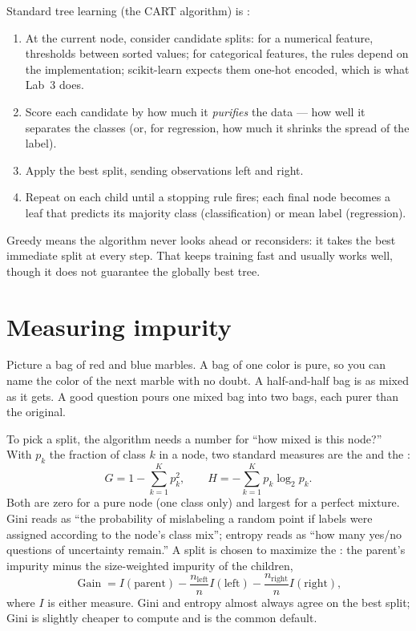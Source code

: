 Standard tree learning (the CART algorithm) is :

\begin{enumerate}
  \item At the current node, consider candidate splits: for a numerical feature, thresholds between sorted values; for categorical features, the rules depend on the implementation; scikit-learn expects them one-hot encoded, which is what Lab~3 does.
  \item Score each candidate by how much it \emph{purifies} the data --- how well it separates the classes (or, for regression, how much it shrinks the spread of the label).
  \item Apply the best split, sending observations left and right.
  \item Repeat on each child until a stopping rule fires; each final node becomes a leaf that predicts its majority class (classification) or mean label (regression).
\end{enumerate}

Greedy means the algorithm never looks ahead or reconsiders: it takes the best immediate split at every step. That keeps training fast and usually works well, though it does not guarantee the globally best tree.

\section{Measuring impurity}

\begin{analogy}
Picture a bag of red and blue marbles. A bag of one color is pure, so you can name the color of the next marble with no doubt. A half-and-half bag is as mixed as it gets. A good question pours one mixed bag into two bags, each purer than the original.
\end{analogy}

To pick a split, the algorithm needs a number for ``how mixed is this node?'' With $p_k$ the fraction of class $k$ in a node, two standard measures are the  and the :
\[
  G=1-\sum_{k=1}^{K}p_k^2,
  \qquad
  H=-\sum_{k=1}^{K}p_k\log_2 p_k.
\]
Both are zero for a pure node (one class only) and largest for a perfect mixture. Gini reads as ``the probability of mislabeling a random point if labels were assigned according to the node's class mix''; entropy reads as ``how many yes/no questions of uncertainty remain.'' A split is chosen to maximize the : the parent's impurity minus the size-weighted impurity of the children,
\[
  \operatorname{Gain}
  =I(\text{parent})
  -\frac{n_{\mathrm{left}}}{n}I(\text{left})
  -\frac{n_{\mathrm{right}}}{n}I(\text{right}),
\]
where $I$ is either measure. Gini and entropy almost always agree on the best split; Gini is slightly cheaper to compute and is the common default.

